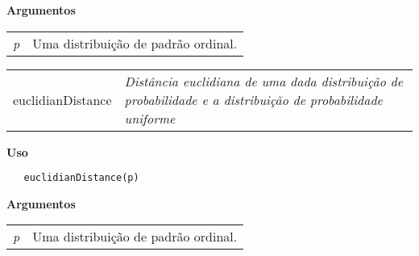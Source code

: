 \textbf{Argumentos}

\begin{table}[!ht]
\begin{center}
\begin{tabularx}{\textwidth}{X X}
\hspace{0.5cm} \textit{p} & Uma distribuição de padrão ordinal.\\
\end{tabularx}
\end{center}
\end{table} 
\newpage

\hrulefill   

\begin{table}[!ht]
\begin{center}
\begin{tabularx}{\textwidth}{ X X}
\hspace{0.5cm} euclidianDistance & \textit{Distância euclidiana de uma dada distribuição de probabilidade e a distribuição de probabilidade uniforme}\\
\end{tabularx}
\end{center}
\end{table} 

\vspace{-0.5cm}

\hrulefill  

\vspace{0.5cm}

\textbf{Uso}

\begin{lstlisting}
   euclidianDistance(p)
\end{lstlisting}

\vspace{0.5cm}

\textbf{Argumentos}

\begin{table}[!ht]
\begin{center}
\begin{tabularx}{\textwidth}{X X}
\hspace{0.5cm} \textit{p} & Uma distribuição de padrão ordinal.\\
\end{tabularx}
\end{center}
\end{table} 


